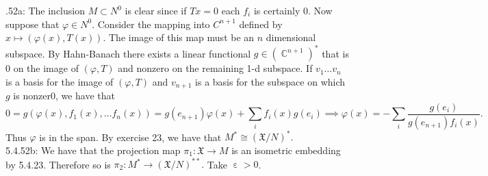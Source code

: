 \documentclass[letterpaper]{article}
\DeclareMathOperator{\C}{\mathbb{C}}
\DeclareMathOperator{\ep}{\varepsilon}
\newcommand{\X}{\mathfrak{X}}
\begin{document}
 .52a: The inclusion $M \subset N^0$ is clear since if $Tx =0$ each $f_i$ is certainly 0. 
Now suppose that $\varphi \in N^0$. Consider the mapping into $C^{n+1}$ defined by $ x \mapsto (\varphi(x), T(x))$. The
image of this map must be an $n$ dimensional subspace. By Hahn-Banach there exists a linear functional $g \in (\C^{n+1})^\ast$ that is 
$0$ on the image of $(\varphi, T)$ and nonzero on the remaining 1-d subspace. If $v_1 \dots v_n$ is a basis for the image of $(\varphi, T)$ and $v_{n+1}$ is a basis for the subspace on which $g$ is nonzer0, we have that 
$$0 = g(\varphi(x), f_1(x) , \dots f_n(x))= g(e_{n+1})\varphi(x) + \sum_{i}f_i(x) g(e_i) \implies \varphi(x)= - \sum_{i}\frac{g(e_i)}{g(e_{n+1}) f_i(x)}.$$
Thus $\varphi$ is in the span. By exercise 23, we have that $M^\ast \cong (\X / N)^\ast. $
\newline \\ 5.4.52b: We have that the projection map $\pi_1: \X \to M$ is an isometric embedding by 5.4.23. Therefore so is $\pi_2 : M^\ast \to (\X / N)^{\ast \ast}.$ Take $\ep >0$. 
\end{document}
